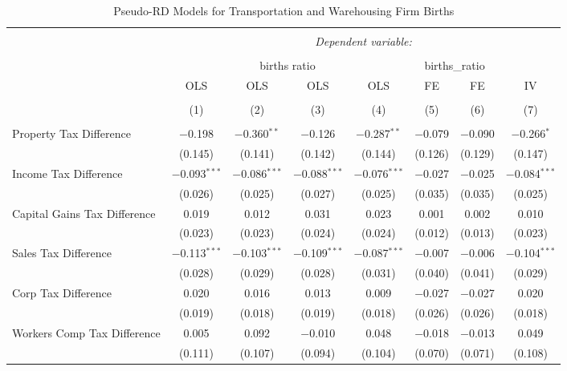 
\begin{table}[!htbp] \centering 
  \caption{Pseudo-RD Models for  Transportation and Warehousing Firm Births} 
  \label{} 
\begin{tabular}{@{\extracolsep{5pt}}lccccccc} 
\\[-1.8ex]\hline 
\hline \\[-1.8ex] 
 & \multicolumn{7}{c}{\textit{Dependent variable:}} \\ 
\cline{2-8} 
\\[-1.8ex] & \multicolumn{4}{c}{births ratio} & \multicolumn{2}{c}{births\_ratio} &   \\ 
 & OLS & OLS & OLS & OLS & FE & FE & IV \\ 
\\[-1.8ex] & (1) & (2) & (3) & (4) & (5) & (6) & (7)\\ 
\hline \\[-1.8ex] 
 Property Tax Difference & $-$0.198 & $-$0.360$^{**}$ & $-$0.126 & $-$0.287$^{**}$ & $-$0.079 & $-$0.090 & $-$0.266$^{*}$ \\ 
  & (0.145) & (0.141) & (0.142) & (0.144) & (0.126) & (0.129) & (0.147) \\ 
  Income Tax Difference & $-$0.093$^{***}$ & $-$0.086$^{***}$ & $-$0.088$^{***}$ & $-$0.076$^{***}$ & $-$0.027 & $-$0.025 & $-$0.084$^{***}$ \\ 
  & (0.026) & (0.025) & (0.027) & (0.025) & (0.035) & (0.035) & (0.025) \\ 
  Capital Gains Tax Difference & 0.019 & 0.012 & 0.031 & 0.023 & 0.001 & 0.002 & 0.010 \\ 
  & (0.023) & (0.023) & (0.024) & (0.024) & (0.012) & (0.013) & (0.023) \\ 
  Sales Tax Difference & $-$0.113$^{***}$ & $-$0.103$^{***}$ & $-$0.109$^{***}$ & $-$0.087$^{***}$ & $-$0.007 & $-$0.006 & $-$0.104$^{***}$ \\ 
  & (0.028) & (0.029) & (0.028) & (0.031) & (0.040) & (0.041) & (0.029) \\ 
  Corp Tax Difference & 0.020 & 0.016 & 0.013 & 0.009 & $-$0.027 & $-$0.027 & 0.020 \\ 
  & (0.019) & (0.018) & (0.019) & (0.018) & (0.026) & (0.026) & (0.018) \\ 
  Workers Comp Tax Difference & 0.005 & 0.092 & $-$0.010 & 0.048 & $-$0.018 & $-$0.013 & 0.049 \\ 
  & (0.111) & (0.107) & (0.094) & (0.104) & (0.070) & (0.071) & (0.108) \\ 

\end{tabular}
\end{table}
